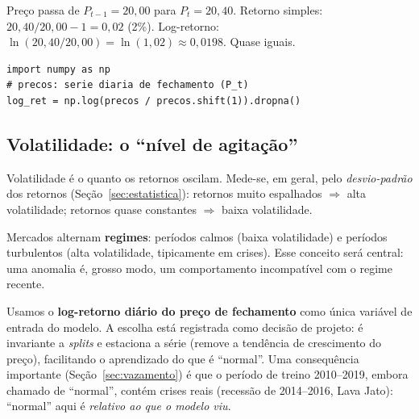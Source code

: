 \begin{exemplo}
Preço passa de $P_{t-1}=20{,}00$ para $P_t=20{,}40$.
Retorno simples: $20{,}40/20{,}00 - 1 = 0{,}02$ (2\%).
Log-retorno: $\ln(20{,}40/20{,}00) = \ln(1{,}02) \approx 0{,}0198$. Quase iguais.
\end{exemplo}

\begin{lstlisting}[caption={Log-retorno em uma linha com pandas/numpy.}]
import numpy as np
# precos: serie diaria de fechamento (P_t)
log_ret = np.log(precos / precos.shift(1)).dropna()
\end{lstlisting}

\subsection{Volatilidade: o ``nível de agitação''}
\begin{definicao}[Volatilidade]
Volatilidade é o quanto os retornos oscilam. Mede-se, em geral, pelo
\emph{desvio-padrão} dos retornos (Seção~\ref{sec:estatistica}): retornos muito
espalhados $\Rightarrow$ alta volatilidade; retornos quase constantes
$\Rightarrow$ baixa volatilidade.
\end{definicao}

Mercados alternam \textbf{regimes}: períodos calmos (baixa volatilidade) e
períodos turbulentos (alta volatilidade, tipicamente em crises). Esse conceito
será central: uma anomalia é, grosso modo, um comportamento incompatível com o
regime recente.

\begin{naprat}
Usamos o \textbf{log-retorno diário do preço de fechamento} como única variável
de entrada do modelo. A escolha está registrada como decisão de projeto: é
invariante a \emph{splits} e estaciona a série (remove a tendência de
crescimento do preço), facilitando o aprendizado do que é ``normal''. Uma
consequência importante (Seção~\ref{sec:vazamento}) é que o período de treino
2010--2019, embora chamado de ``normal'', contém crises reais (recessão de
2014--2016, Lava Jato): ``normal'' aqui é \emph{relativo ao que o modelo viu}.
\end{naprat}
